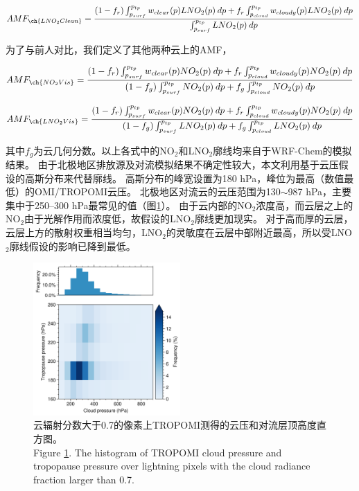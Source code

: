 \begin{equation} \label{eq:AMF_LNO2clean}
AMF_{\ch{LNO_2Clean}} = \frac{(1-f_r) \int_{p_{surf}}^{p_{tp}} w_{clear}(p) LNO_2(p) \: dp + f_r \int_{p_{cloud}}^{p_{tp}} w_{cloudy}(p) LNO_2(p) \: dp}{\int_{p_{surf}}^{p_{tp}} LNO_2(p) \: dp}
\end{equation}

为了与前人对比，我们定义了其他两种云上的AMF，

\begin{equation} \label{eq:AMF_NO2Vis}
AMF_{\ch{NO_2Vis}} = \frac{(1-f_r) \int_{p_{surf}}^{p_{tp}} w_{clear}(p) NO_2(p) \: dp + f_r \int_{p_{cloud}}^{p_{tp}} w_{cloudy}(p) NO_2(p) \: dp}{(1-f_g) \int_{p_{surf}}^{p_{tp}} NO_2(p) \: dp + f_g \int_{p_{cloud}}^{p_{tp}} NO_2(p) \: dp}
\end{equation}

\begin{equation} \label{eq:AMF_LNO2Vis}
AMF_{\ch{LNO_2Vis}} = \frac{(1-f_r) \int_{p_{surf}}^{p_{tp}} w_{clear}(p) NO_2(p) \: dp + f_r \int_{p_{cloud}}^{p_{tp}} w_{cloudy}(p) NO_2(p) \: dp}{(1-f_g) \int_{p_{surf}}^{p_{tp}} LNO_2(p) \: dp + f_g \int_{p_{cloud}}^{p_{tp}} LNO_2(p) \: dp}
\end{equation}

其中$f_g$为云几何分数。以上各式中的NO$_2$和LNO$_2$廓线均来自于WRF-Chem的模拟结果。
由于北极地区排放源及对流模拟结果不确定性较大，本文利用基于云压假设的高斯分布来代替廓线。
高斯分布的峰宽设置为180 hPa，峰位为最高（数值最低）的OMI/TROPOMI云压。
北极地区对流云的云压范围为130$\sim$987 hPa，主要集中于250--300 hPa最常见的值（图\ref{fig:pcld_ptropo}）。
由于云内部的NO$_2$浓度高，而云层之上的NO$_2$由于光解作用而浓度低，故假设的LNO$_2$廓线更加现实\citep{Beirle.2009}。
对于高而厚的云层，云层上方的散射权重相当均匀，LNO$_2$的灵敏度在云层中部附近最高，所以受LNO$_2$廓线假设的影响已降到最低\citep{Laughner.2017}。

\begin{figure}[!htbp]
\centering
\includegraphics[width=0.5\textwidth]{./figures/pcld_ptropo.png}
\caption{云辐射分数大于0.7的像素上TROPOMI测得的云压和对流层顶高度直方图。\\
Figure \ref{fig:pcld_ptropo}. The histogram of TROPOMI cloud pressure and tropopause pressure over lightning
pixels with the cloud radiance fraction larger than 0.7.
}
\label{fig:pcld_ptropo}
\end{figure}


